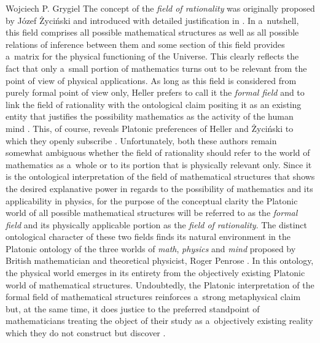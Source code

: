 \begin{artengenv}{Wojciech P. Grygiel}
The concept of the \textit{field of rationality} was originally proposed by Józef Życiński and introduced with detailed justification in 
\parencite[][]{zycinski_filozoficzne_1987}. %
 In a~nutshell, this field comprises all possible mathematical structures as well as all possible relations of inference between them and some section of this field provides a~matrix for the physical functioning of the Universe. This clearly reflects the fact that only a~small portion of mathematics turns out to be relevant from the point of view of physical applications. As long as this field is considered from purely formal point of view only, Heller prefers to call it the \textit{formal field} and to link the field of rationality with the ontological claim positing it as an existing entity that justifies the possibility mathematics as the activity of the human mind 
\parencite[][p.238]{heller_uchwycic_1997}. %
 This, of course, reveals Platonic preferences of Heller and Życiński to which they openly subscribe 
\parencite[e.g][]{zycinski_swiat_2013}. %
 Unfortunately, both these authors remain somewhat ambiguous whether the field of rationality should refer to the world of mathematics as a~whole or to its portion that is physically relevant only. Since it is the ontological interpretation of the field of mathematical structures that shows the desired explanative power in regards to the possibility of mathematics and its applicability in physics, for the purpose of the conceptual clarity the Platonic world of all possible mathematical structures will be referred to as the \textit{formal field} and its physically applicable portion as the \textit{field of rationality}. The distinct ontological character of these two fields finds its natural environment in the Platonic ontology of the three worlds of \textit{math}, \textit{physics} and \textit{mind} proposed by British mathematician and theoretical physicist, Roger Penrose 
\parencite[e.g][pp.17–21]{penrose_road_2004}. %
 In this ontology, the physical world emerges in its entirety from the objectively existing Platonic world of mathematical structures. Undoubtedly, the Platonic interpretation of the formal field of mathematical structures reinforces a~strong metaphysical claim but, at the same time, it does justice to the preferred standpoint of mathematicians treating the object of their study as a~objectively existing reality which they do not construct but discover 
\parencite[e.g][p.13]{penrose_road_2004}.%





\end{artengenv}
